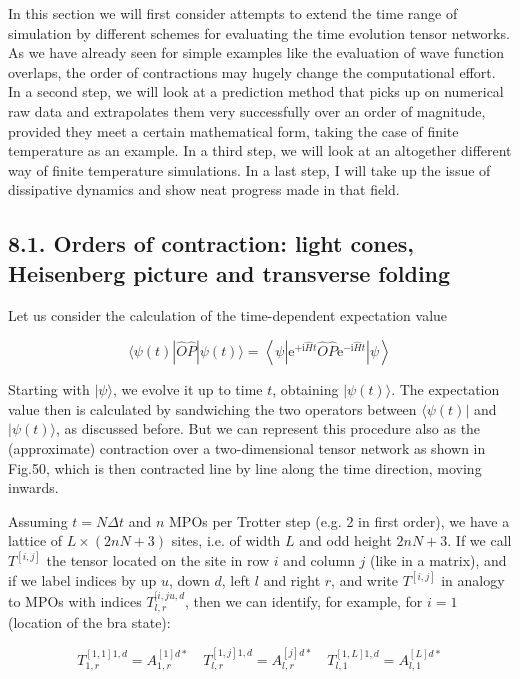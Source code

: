 \documentclass[12pt]{article}
\begin{document}
In this section we will first consider attempts to extend the time range of simulation by different schemes for evaluating the time evolution tensor networks. As we have already seen for simple examples like the evaluation of wave function overlaps, the order of contractions may hugely change the computational effort. In a second step, we will look at a prediction method that picks up on numerical raw data and extrapolates them very successfully over an order of magnitude, provided they meet a certain mathematical form, taking the case of finite temperature as an example. In a third step, we will look at an altogether different way of finite temperature simulations. In a last step, I will take up the issue of dissipative dynamics and show neat progress made in that field.

\subsection*{8.1. Orders of contraction: light cones, Heisenberg picture and transverse folding}
Let us consider the calculation of the time-dependent expectation value


\begin{equation*}
\langle\psi(t)|\hat{O} \hat{P}| \psi(t)\rangle=\left\langle\psi\left|\mathrm{e}^{+\mathrm{i} \hat{H} t} \hat{O} \hat{P} \mathrm{e}^{-\mathrm{i} \hat{H} t}\right| \psi\right\rangle \tag{277}
\end{equation*}


Starting with $|\psi\rangle$, we evolve it up to time $t$, obtaining $|\psi(t)\rangle$. The expectation value then is calculated by sandwiching the two operators between $\langle\psi(t)|$ and $|\psi(t)\rangle$, as discussed before. But we can represent this procedure also as the (approximate) contraction over a two-dimensional tensor network as shown in Fig.50, which is then contracted line by line along the time direction, moving inwards.

Assuming $t=N \Delta t$ and $n$ MPOs per Trotter step (e.g. 2 in first order), we have a lattice of $L \times(2 n N+3)$ sites, i.e. of width $L$ and odd height $2 n N+3$. If we call $T^{[i, j]}$ the tensor located on the site in row $i$ and column $j$ (like in a matrix), and if we label indices by up $u$, down $d$, left $l$ and right $r$, and write $T^{[i, j]}$ in analogy to MPOs with indices $T_{l, r}^{[i, j u, d}$, then we can identify, for example, for $i=1$ (location of the bra state):


\begin{equation*}
T_{1, r}^{[1,1] 1, d}=A_{1, r}^{[1] d *} \quad T_{l, r}^{[1, j] 1, d}=A_{l, r}^{[j] d *} \quad T_{l, 1}^{[1, L] 1, d}=A_{l, 1}^{[L] d *} \tag{278}
\end{equation*}
\end{document}
